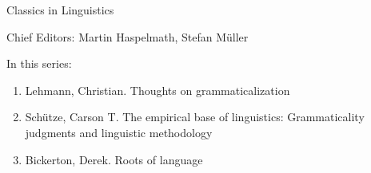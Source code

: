 {\large Classics in Linguistics}

\bigskip

Chief Editors: Martin Haspelmath, Stefan Müller

\bigskip

In this series:

\begin{enumerate}
\item Lehmann, Christian. Thoughts on grammaticalization
\item Schütze, Carson T. The empirical base of linguistics: Grammaticality judgments and linguistic methodology
\item Bickerton, Derek. Roots of language
\end{enumerate}


\vfill

